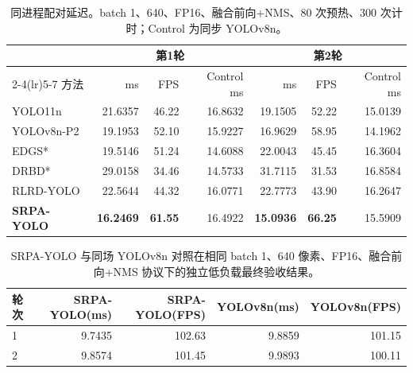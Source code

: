 \begin{table}[!t]\caption{同进程配对延迟。batch 1、640、FP16、融合前向+NMS、80 次预热、300 次计时；Control 为同步 YOLOv8n。\label{tab:latency}}\centering\srpatablesetup
\begin{tabular}{lrrrrrr}\toprule
&\multicolumn{3}{c}{第1轮}&\multicolumn{3}{c}{第2轮}\\\cmidrule(lr){2-4}\cmidrule(lr){5-7}
方法&ms&FPS&Control ms&ms&FPS&Control ms\\\midrule
YOLO11n&21.6357&46.22&16.8632&19.1505&52.22&15.0139\\
YOLOv8n-P2&19.1953&52.10&15.9227&16.9629&58.95&14.1962\\
EDGS*&19.5146&51.24&14.6088&22.0043&45.45&16.3604\\
DRBD*&29.0158&34.46&14.5733&31.7115&31.53&16.8584\\
RLRD-YOLO&22.5644&44.32&16.0771&22.7773&43.90&16.2647\\
\textbf{SRPA-YOLO}&\textbf{16.2469}&\textbf{61.55}&16.4922&\textbf{15.0936}&\textbf{66.25}&15.5909\\\bottomrule
\end{tabular}\end{table}
\begin{table}[!t]\caption{SRPA-YOLO 与同场 YOLOv8n 对照在相同 batch 1、640 像素、FP16、融合前向+NMS 协议下的独立低负载最终验收结果。\label{tab:cleanlat}}\centering\srpatablesetup
\begin{tabular}{lrrrr}\toprule
轮次&SRPA-YOLO(ms)&SRPA-YOLO(FPS)&YOLOv8n(ms)&YOLOv8n(FPS)\\\midrule
1&9.7435&102.63&9.8859&101.15\\2&9.8574&101.45&9.9893&100.11\\\bottomrule
\end{tabular}\end{table}
